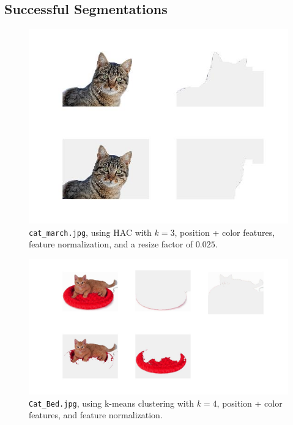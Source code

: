 \documentclass[12pt]{article}
\begin{document}
\subsection{Successful Segmentations}
\begin{figure}[H]
	\centering
	\includegraphics[width=.9\textwidth]{succ1.jpg}
	\caption{\texttt{cat\_march.jpg}, using HAC with $k = 3$, position + color features, feature normalization, and a resize factor of $0.025$.}
\end{figure}

\begin{figure}[H]
	\centering
	\includegraphics[width=.95\textwidth]{succ2.jpg}
	\caption{\texttt{Cat\_Bed.jpg}, using k-means clustering with $k = 4$, position + color features, and feature normalization.}
\end{figure}
\end{document}
